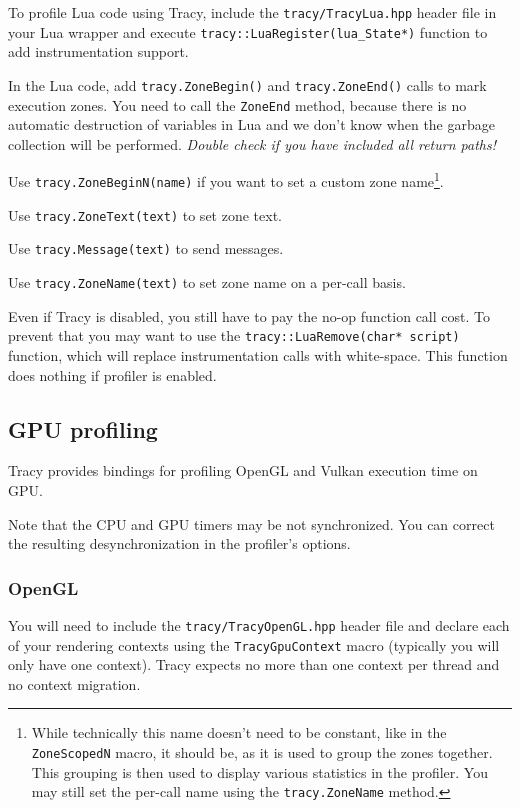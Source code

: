 \documentclass[hidelinks,titlepage,a4paper]{article}
\begin{document}
To profile Lua code using Tracy, include the \texttt{tracy/TracyLua.hpp} header file in your Lua wrapper and execute \texttt{tracy::LuaRegister(lua\_State*)} function to add instrumentation support.

In the Lua code, add \texttt{tracy.ZoneBegin()} and \texttt{tracy.ZoneEnd()} calls to mark execution zones. You need to call the \texttt{ZoneEnd} method, because there is no automatic destruction of variables in Lua and we don't know when the garbage collection will be performed. \emph{Double check if you have included all return paths!}

Use \texttt{tracy.ZoneBeginN(name)} if you want to set a custom zone name\footnote{While technically this name doesn't need to be constant, like in the \texttt{ZoneScopedN} macro, it should be, as it is used to group the zones together. This grouping is then used to display various statistics in the profiler. You may still set the per-call name using the \texttt{tracy.ZoneName} method.}.

Use \texttt{tracy.ZoneText(text)} to set zone text.

Use \texttt{tracy.Message(text)} to send messages.

Use \texttt{tracy.ZoneName(text)} to set zone name on a per-call basis.

Even if Tracy is disabled, you still have to pay the no-op function call cost. To prevent that you may want to use the \texttt{tracy::LuaRemove(char* script)} function, which will replace instrumentation calls with white-space. This function does nothing if profiler is enabled.

\subsection{GPU profiling}

Tracy provides bindings for profiling OpenGL and Vulkan execution time on GPU.

Note that the CPU and GPU timers may be not synchronized. You can correct the resulting desynchronization in the profiler's options.

\subsubsection{OpenGL}

You will need to include the \texttt{tracy/TracyOpenGL.hpp} header file and declare each of your rendering contexts using the \texttt{TracyGpuContext} macro (typically you will only have one context). Tracy expects no more than one context per thread and no context migration.
\end{document}
